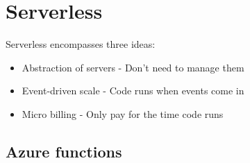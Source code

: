 \documentclass{article}[18pt]
\begin{document}
\section{Serverless}
Serverless encompasses three ideas:
\begin{itemize}
	\item Abstraction of servers - Don't need to manage them
	\item Event-driven scale - Code runs when events come in
	\item Micro billing - Only pay for the time code runs
\end{itemize}
\subsection{Azure functions}
\end{document}
